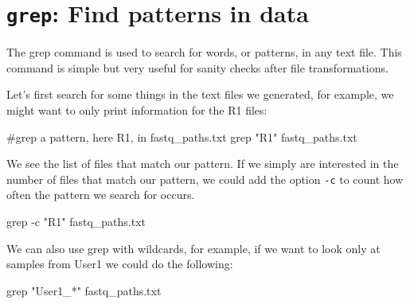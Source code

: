 \documentclass[
  letterpaper,
  DIV=11,
  numbers=noendperiod]{scrreprt}
\newenvironment{Shaded}{}{}
\newcommand{\AttributeTok}[1]{\textcolor[rgb]{0.84,0.23,0.29}{#1}}
\newcommand{\CommentTok}[1]{\textcolor[rgb]{0.42,0.45,0.49}{#1}}
\newcommand{\FunctionTok}[1]{\textcolor[rgb]{0.44,0.26,0.76}{#1}}
\newcommand{\NormalTok}[1]{\textcolor[rgb]{0.14,0.16,0.18}{#1}}
\newcommand{\StringTok}[1]{\textcolor[rgb]{0.01,0.18,0.38}{#1}}
\begin{document}
\section{\texorpdfstring{\texttt{grep}: Find patterns in
data}{grep: Find patterns in data}}\label{grep-find-patterns-in-data}

The grep command is used to search for words, or patterns, in any text
file. This command is simple but very useful for sanity checks after
file transformations.

Let's first search for some things in the text files we generated, for
example, we might want to only print information for the R1 files:

\begin{Shaded}
\begin{Highlighting}[]
\CommentTok{\#grep a pattern, here R1, in fastq\_paths.txt}
\FunctionTok{grep} \StringTok{"R1"}\NormalTok{ fastq\_paths.txt}
\end{Highlighting}
\end{Shaded}

We see the list of files that match our pattern. If we simply are
interested in the number of files that match our pattern, we could add
the option \texttt{-c} to count how often the pattern we search for
occurs.

\begin{Shaded}
\begin{Highlighting}[]
\FunctionTok{grep} \AttributeTok{{-}c} \StringTok{"R1"}\NormalTok{ fastq\_paths.txt}
\end{Highlighting}
\end{Shaded}

We can also use grep with wildcards, for example, if we want to look
only at samples from User1 we could do the following:

\begin{Shaded}
\begin{Highlighting}[]
\FunctionTok{grep} \StringTok{"User1\_*"}\NormalTok{ fastq\_paths.txt}
\end{Highlighting}
\end{Shaded}
\end{document}

